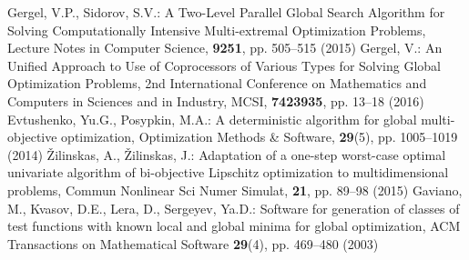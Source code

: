 \documentclass[runningheads]{llncs}
\begin{document}
\begin{thebibliography}{8}
	Gergel, V.P., Sidorov, S.V.: A Two-Level Parallel Global Search Algorithm for Solving Computationally Intensive Multi-extremal Optimization Problems,  Lecture Notes in Computer Science, \textbf{9251}, pp. 505--515 (2015)
	Gergel, V.: An Unified Approach to Use of Coprocessors of Various Types for Solving Global Optimization Problems,  2nd International Conference on Mathematics and Computers in Sciences and in Industry, MCSI, \textbf{7423935}, pp. 13--18 (2016)
	Evtushenko, Yu.G., Posypkin, M.A.: A deterministic algorithm for global multi-objective optimization,  Optimization Methods \& Software, \textbf{29}(5), pp. 1005--1019 (2014)
	{\v Z}ilinskas, A., {\v Z}ilinskas, J.: Adaptation of a one-step worst-case optimal univariate algorithm of bi-objective Lipschitz optimization to multidimensional problems,  Commun Nonlinear Sci Numer Simulat, \textbf{21}, pp. 89--98 (2015)
	Gaviano, M., Kvasov, D.E., Lera, D., Sergeyev, Ya.D.: Software for generation of classes of test functions with known local and global minima for global optimization,  ACM Transactions on Mathematical Software \textbf{29}(4), pp. 469--480 (2003)

\end{thebibliography}
\end{document}
